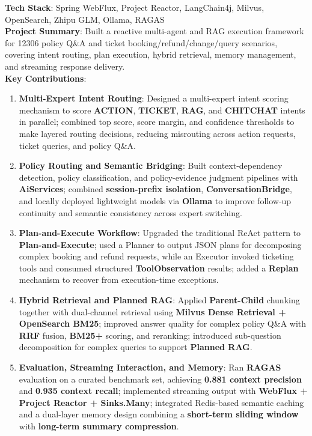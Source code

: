 \documentclass{resume}
\begin{document}
\textbf{Tech Stack}: Spring WebFlux, Project Reactor, LangChain4j, Milvus, OpenSearch, Zhipu GLM, Ollama, RAGAS\\
\textbf{Project Summary}: Built a reactive multi-agent and RAG execution framework for 12306 policy Q\&A and ticket booking/refund/change/query scenarios, covering intent routing, plan execution, hybrid retrieval, memory management, and streaming response delivery.\\
\textbf{Key Contributions}:
\begin{enumerate}[parsep=0.5ex]
    \item \textbf{Multi-Expert Intent Routing}: Designed a multi-expert intent scoring mechanism to score \textbf{ACTION}, \textbf{TICKET}, \textbf{RAG}, and \textbf{CHITCHAT} intents in parallel; combined top score, score margin, and confidence thresholds to make layered routing decisions, reducing misrouting across action requests, ticket queries, and policy Q\&A.
    \item \textbf{Policy Routing and Semantic Bridging}: Built context-dependency detection, policy classification, and policy-evidence judgment pipelines with \textbf{AiServices}; combined \textbf{session-prefix isolation}, \textbf{ConversationBridge}, and locally deployed lightweight models via \textbf{Ollama} to improve follow-up continuity and semantic consistency across expert switching.
    \item \textbf{Plan-and-Execute Workflow}: Upgraded the traditional ReAct pattern to \textbf{Plan-and-Execute}; used a Planner to output JSON plans for decomposing complex booking and refund requests, while an Executor invoked ticketing tools and consumed structured \textbf{ToolObservation} results; added a \textbf{Replan} mechanism to recover from execution-time exceptions.
    \item \textbf{Hybrid Retrieval and Planned RAG}: Applied \textbf{Parent-Child} chunking together with dual-channel retrieval using \textbf{Milvus Dense Retrieval + OpenSearch BM25}; improved answer quality for complex policy Q\&A with \textbf{RRF} fusion, \textbf{BM25+} scoring, and reranking; introduced sub-question decomposition for complex queries to support \textbf{Planned RAG}.
    \item \textbf{Evaluation, Streaming Interaction, and Memory}: Ran \textbf{RAGAS} evaluation on a curated benchmark set, achieving \textbf{0.881 context precision} and \textbf{0.935 context recall}; implemented streaming output with \textbf{WebFlux + Project Reactor + Sinks.Many}; integrated Redis-based semantic caching and a dual-layer memory design combining a \textbf{short-term sliding window} with \textbf{long-term summary compression}.
\end{enumerate}
\end{document}
